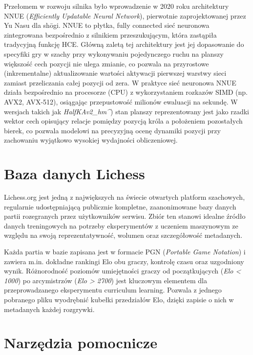 \documentclass[12pt,a4paper]{report}
\begin{document}
Przełomem w rozwoju silnika było wprowadzenie w 2020 roku architektury NNUE (\textit{Efficiently Updatable Neural Network}), pierwotnie zaprojektowanej przez Yu Nasu dla shōgi. NNUE to płytka, fully connected sieć neuronowa zintegrowana bezpośrednio z silnikiem przeszukującym, która zastąpiła tradycyjną funkcję HCE. Główną zaletą tej architektury jest jej dopasowanie do specyfiki gry w szachy przy wykonywaniu pojedynczego ruchu na planszy większość cech pozycji nie ulega zmianie, co pozwala na przyrostowe (inkrementalne) aktualizowanie wartości aktywacji pierwszej warstwy sieci zamiast przeliczania całej pozycji od zera. W praktyce sieć neuronowa NNUE działa bezpośrednio na procesorze (CPU) z wykorzystaniem rozkazów SIMD (np. AVX2, AVX-512), osiągając przepustowość milionów ewaluacji na sekundę. W wersjach takich jak \textit{HalfKAv2\_hm\string^}) stan planszy reprezentowany jest jako rzadki wektor cech opisujący relacje pomiędzy pozycją króla a położeniem pozostałych bierek, co pozwala modelowi na precyzyjną ocenę dynamiki pozycji przy zachowaniu wyjątkowo wysokiej wydajności obliczeniowej.


\section{Baza danych Lichess}

Lichess.org jest jedną z największych na świecie otwartych platform szachowych, regularnie udostępniającą publicznie kompletne, zaanonimowane bazy danych partii rozegranych przez użytkowników serwisu. Zbiór ten stanowi idealne źródło danych treningowych na potrzeby eksperymentów z uczeniem maszynowym ze względu na swoją reprezentatywność, wolumen oraz szczegółowość metadanych.

Każda partia w bazie zapisana jest w formacie PGN (\textit{Portable Game Notation}) i zawiera m.in. dokładne rankingi Elo obu graczy, kontrolę czasu oraz uzgodniony wynik. Różnorodność poziomów umiejętności graczy od początkujących (\textit{Elo < 1000}) po arcymistrzów (\textit{Elo > 2700}) jest kluczowym elementem dla przeprowadzanego eksperymentu curriculum learning. Pozwala z jednego pobranego pliku wyodrębnić kubełki przedziałów Elo, dzięki zapisie o nich w metadanych każdej rozgrywki.

\section{Narzędzia pomocnicze}
\end{document}
